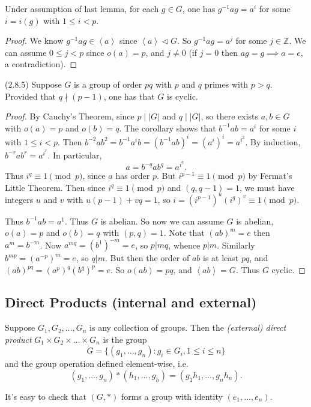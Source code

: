 \begin{corollary}
	Under assumption of last lemma, for each $g \in G$, one has $g^{-1} a g = a^{i}$ for some $i = i(g)$ with $1\le i < p$.
\end{corollary}
\begin{proof}
	We know $g^{-1} a g \in \left\langle a \right\rangle $ since $\left\langle a \right\rangle \triangleleft G$. So $g^{-1} ag = a^j$ for some $j \in \mathbb{Z}$. We can assume $0\le j<p$ since $o(a) = p$, and $j\neq 0$ (if $j = 0$ then $ag = g \implies a = e$, a contradiction).
\end{proof}


\begin{theorem}
	(2.8.5)
	Suppose $G$ is a group of order $pq$ with $p$ and $q$ primes with $p > q$. Provided that $q \nmid (p-1)$, one has that $G$ is cyclic.
\end{theorem}
\begin{proof}
	By Cauchy's Theorem, since $p \mid |G|$ and $q \mid |G|$, so there exists $a, b \in G$ with $o(a) = p$ and $o(b) = q$. The corollary shows that $b^{-1} ab = a^i$ for some $i$ with $1\le i<p$. Then $b^{-2} a b^2 = b^{-1} a^i b = (b^{-1}ab)^{i} = (a^i)^{i} = a^{i^2}$. By induction, $b^{-r} a b^r = a^{i^r}$. In particular, \[
		a = b^{-q} a b^q = a^{i^q}
	.\] 
	Thus $i^q \equiv 1 \pmod p$, since $a$ has order $p$. But $i^{p-1}\equiv 1 \pmod p$ by Fermat's Little Theorem. Then since $i^q \equiv 1 \pmod p$ and $(q, q-1) = 1$, we must have integers  $u$ and $v$ with $u(p-1) + vq = 1$, so $i = (i^{p-1})^u (i^q)^v \equiv 1 \pmod p$.
	
	Thus $b^{-1} ab = a^1$. Thus $G$ is abelian. So now we can assume $G$ is abelian, $o(a) = p$ and $o(b) = q$ with $(p,q) = 1$. Note that $(ab)^m = e$ then $a^m = b^{-m}$. Now $a^{mq } = (b^1)^{-m} = e$, so $p | mq $, whence $p | m$. Similarly $b^{mp } = (a^{-p})^m = e$, so $q | m$. But then the order of $ab $ is at least $pq $, and $(ab)^{pq } = (a^p)^q (b^q)^p = e$. So  $o(ab) = pq $, and $\left\langle ab  \right\rangle  = G$. Thus $G$ cyclic.
\end{proof}

\subsection{Direct Products (internal and external)}

\begin{definition}
	Suppose $G_1, G_2, \ldots, G_n$ is any collection of groups. Then the \textit{(external) direct product} $G_1\times G_2\times \ldots\times G_n$ is the group \[
		G = \{(g_1, \ldots, g_n): g_i \in G_i, 1\le i\le n\} 
	\] 
	and the group operation defined element-wise, i.e.\[
		(g_1, \ldots, g_n)*(h_1, \ldots, g_h) = 
		(g_1h_1,\ldots,g_nh_n)
	.\] 
\end{definition}
It's easy to check that $(G, *)$ forms a group with identity $(e_1,\ldots,e_n)$.

